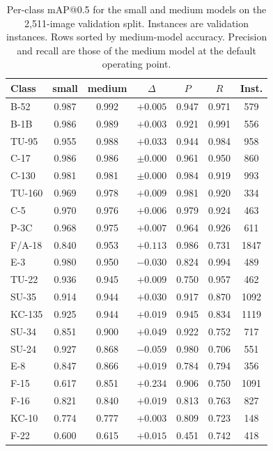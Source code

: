 \documentclass[conference]{IEEEtran}
\begin{document}
\begin{table}[t]
\centering
\caption{Per-class mAP@0.5 for the small and medium models on the 2{,}511-image
validation split. Instances are validation instances. Rows sorted by
medium-model accuracy. Precision and recall are those of the medium model at the
default operating point.}
\label{tab:perclass}
\setlength{\tabcolsep}{4pt}
\footnotesize
\begin{tabular}{@{}lcccccc@{}}
\toprule
Class & small & medium & $\Delta$ & $P$ & $R$ & Inst. \\
\midrule
B-52   & 0.987 & 0.992 & $+0.005$ & 0.947 & 0.971 & 579 \\
B-1B   & 0.986 & 0.989 & $+0.003$ & 0.921 & 0.991 & 556 \\
TU-95  & 0.955 & 0.988 & $+0.033$ & 0.944 & 0.984 & 958 \\
C-17   & 0.986 & 0.986 & $\pm0.000$ & 0.961 & 0.950 & 860 \\
C-130  & 0.981 & 0.981 & $\pm0.000$ & 0.984 & 0.919 & 993 \\
TU-160 & 0.969 & 0.978 & $+0.009$ & 0.981 & 0.920 & 334 \\
C-5    & 0.970 & 0.976 & $+0.006$ & 0.979 & 0.924 & 463 \\
P-3C   & 0.968 & 0.975 & $+0.007$ & 0.964 & 0.926 & 611 \\
F/A-18 & 0.840 & 0.953 & $+0.113$ & 0.986 & 0.731 & 1847 \\
E-3    & 0.980 & 0.950 & $-0.030$ & 0.824 & 0.994 & 489 \\
TU-22  & 0.936 & 0.945 & $+0.009$ & 0.750 & 0.957 & 462 \\
SU-35  & 0.914 & 0.944 & $+0.030$ & 0.917 & 0.870 & 1092 \\
KC-135 & 0.925 & 0.944 & $+0.019$ & 0.945 & 0.834 & 1119 \\
SU-34  & 0.851 & 0.900 & $+0.049$ & 0.922 & 0.752 & 717 \\
SU-24  & 0.927 & 0.868 & $-0.059$ & 0.980 & 0.706 & 551 \\
E-8    & 0.847 & 0.866 & $+0.019$ & 0.784 & 0.794 & 356 \\
F-15   & 0.617 & 0.851 & $+0.234$ & 0.906 & 0.750 & 1091 \\
F-16   & 0.821 & 0.840 & $+0.019$ & 0.813 & 0.763 & 827 \\
KC-10  & 0.774 & 0.777 & $+0.003$ & 0.809 & 0.723 & 148 \\
F-22   & 0.600 & 0.615 & $+0.015$ & 0.451 & 0.742 & 418 \\
\bottomrule
\end{tabular}
\end{table}
\end{document}
